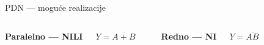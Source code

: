\begin{frame}[label=09_1-s010]{PDN — moguće realizacije}\setlength{\parskip}{2pt}\setlength{\abovedisplayskip}{4pt}\setlength{\belowdisplayskip}{4pt}\setlength{\abovedisplayshortskip}{3pt}\setlength{\belowdisplayshortskip}{3pt}
\begin{columns}[T,onlytextwidth]\centering {}\textbf{Paralelno — NILI}\par $Y=\overline{A+B}$\par\smallskip\begin{columns}[c,onlytextwidth]\centering {}\centering {}\centering \end{columns}
\smallskip\textbf{Redno — NI}\par $Y=\overline{AB}$\par\smallskip\begin{columns}[c,onlytextwidth]\centering {}\centering {}\centering \end{columns}
\end{columns}
\end{frame}
